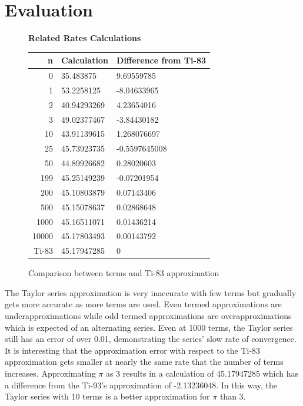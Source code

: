 \documentclass[12pt, titlepage]{article}
\begin{document}
\section{Evaluation}
\begin{figure}[H]
\begin{center}
  \textbf{Related Rates Calculations} \par \medskip
  \begin{tabular}{rll}
  n & Calculation & Difference from Ti-83\\
  \hline
    0 & 35.483875 & 9.69559785\\
  1 & 53.2258125 & -8.04633965\\
  2 & 40.94293269 & 4.23654016\\
  3 & 49.02377467 & -3.84430182\\
  10 & 43.91139615 & 1.268076697 \\
  25 & 45.73923735 & -0.5597645008 \\ 
  50 & 44.89926682& 0.28020603\\
  199 & 45.25149239 &-0.07201954 \\
  200 &  45.10803879& 0.07143406\\
  500 & 45.15078637 & 0.02868648\\
  1000 & 45.16511071 & 0.01436214\\
  10000 & 45.17803493 & 0.00143792\\
  \hline
  Ti-83 & 45.17947285  & 0\\
  \end{tabular}
	\caption{Comparison between terms and Ti-83 approximation}
\end{center}
\end{figure}

The Taylor series approximation is very inaccurate with few terms but gradually gets more accurate as more terms are used. Even termed approximations are underapproximations while odd termed approximations are overapproximations which is expected of an alternating series. Even at 1000 terms, the Taylor series still has an error of over 0.01, demonstrating the series' slow rate of convergence. It is interesting that the approximation error with respect to the Ti-83 approximation gets smaller at nearly the same rate that the number of terms increases. Approximating \(\pi\) as 3 results in a calculation of 45.17947285 which has a difference from the Ti-93's approximation of -2.13236048. In this way, the Taylor series with 10 terms is a better approximation for \(\pi\) than 3. 
\end{document}
